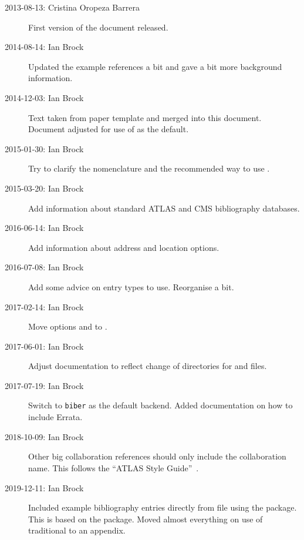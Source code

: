\documentclass[UKenglish, texlive=2016]{\ATLASLATEXPATH atlasdoc}
\begin{document}
\begin{description}
\item[2013-08-13: Cristina Oropeza Barrera] First version of the document released.
\item[2014-08-14: Ian Brock] Updated the example references a bit and gave a bit more background information.
\item[2014-12-03: Ian Brock] Text taken from paper template and merged into this document.
  Document adjusted for use of  as the default.
\item[2015-01-30: Ian Brock] Try to clarify the nomenclature and
  the recommended way to use \BibTeX.
\item[2015-03-20: Ian Brock] Add information about standard ATLAS and CMS bibliography databases.
\item[2016-06-14: Ian Brock] Add information about address and location options.
\item[2016-07-08: Ian Brock] Add some advice on entry types to use. Reorganise a bit.
\item[2017-02-14: Ian Brock] Move options  and  to .
\item[2017-06-01: Ian Brock] Adjust documentation to reflect change of directories for  and  files.
\item[2017-07-19: Ian Brock] Switch to \texttt{biber} as the default  backend.
  Added documentation on how to include Errata.
\item[2018-10-09: Ian Brock] Other big collaboration references should only include the collaboration name.
  This follows the \enquote{ATLAS Style Guide}~\cite{atlas-style}.
\item[2019-12-11: Ian Brock] Included example bibliography entries directly from  file using the  package.
  This is based on the  package.
  Moved almost everything on use of traditional \BibTeX to an appendix.
\end{description}
\end{document}
